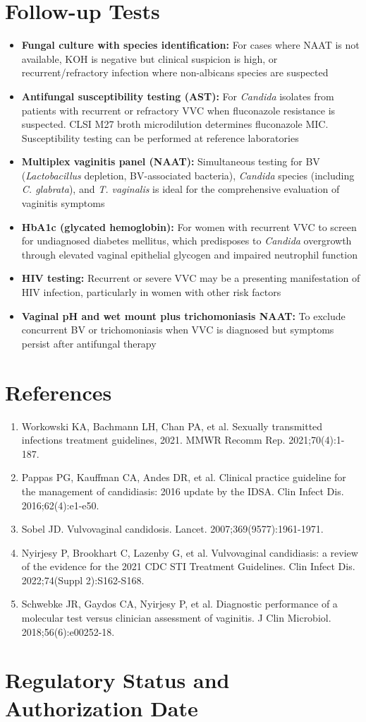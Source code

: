 \section*{Follow-up Tests}
\begin{itemize}
  \item \textbf{Fungal culture with species identification:} For cases where NAAT is not available, KOH is negative but clinical suspicion is high, or recurrent/refractory infection where non-albicans species are suspected
  \item \textbf{Antifungal susceptibility testing (AST):} For \textit{Candida} isolates from patients with recurrent or refractory VVC when fluconazole resistance is suspected. CLSI M27 broth microdilution determines fluconazole MIC. Susceptibility testing can be performed at reference laboratories
  \item \textbf{Multiplex vaginitis panel (NAAT):} Simultaneous testing for BV (\textit{Lactobacillus} depletion, BV-associated bacteria), \textit{Candida} species (including \textit{C. glabrata}), and \textit{T. vaginalis} is ideal for the comprehensive evaluation of vaginitis symptoms
  \item \textbf{HbA1c (glycated hemoglobin):} For women with recurrent VVC to screen for undiagnosed diabetes mellitus, which predisposes to \textit{Candida} overgrowth through elevated vaginal epithelial glycogen and impaired neutrophil function
  \item \textbf{HIV testing:} Recurrent or severe VVC may be a presenting manifestation of HIV infection, particularly in women with other risk factors
  \item \textbf{Vaginal pH and wet mount plus trichomoniasis NAAT:} To exclude concurrent BV or trichomoniasis when VVC is diagnosed but symptoms persist after antifungal therapy
\end{itemize}

\section*{References}
\begin{enumerate}
  \item Workowski KA, Bachmann LH, Chan PA, et al. Sexually transmitted infections treatment guidelines, 2021. MMWR Recomm Rep. 2021;70(4):1-187.
  \item Pappas PG, Kauffman CA, Andes DR, et al. Clinical practice guideline for the management of candidiasis: 2016 update by the IDSA. Clin Infect Dis. 2016;62(4):e1-e50.
  \item Sobel JD. Vulvovaginal candidosis. Lancet. 2007;369(9577):1961-1971.
  \item Nyirjesy P, Brookhart C, Lazenby G, et al. Vulvovaginal candidiasis: a review of the evidence for the 2021 CDC STI Treatment Guidelines. Clin Infect Dis. 2022;74(Suppl 2):S162-S168.
  \item Schwebke JR, Gaydos CA, Nyirjesy P, et al. Diagnostic performance of a molecular test versus clinician assessment of vaginitis. J Clin Microbiol. 2018;56(6):e00252-18.
\end{enumerate}

\clearpage
\section*{Regulatory Status and Authorization Date}

\clearpage
